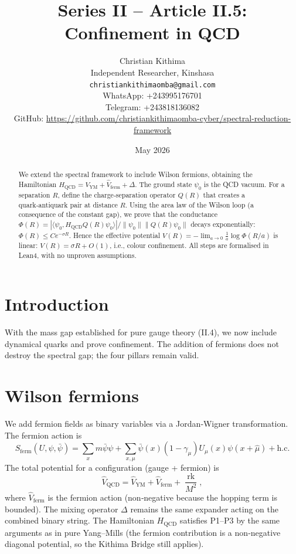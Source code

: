 \documentclass[11pt,a4paper]{article}
\title{Series II – Article II.5: Confinement in QCD}
\author{Christian Kithima \\
Independent Researcher, Kinshasa \\
\texttt{christiankithimaomba@gmail.com} \\
WhatsApp: +243995176701 \\
Telegram: +243818136082 \\
GitHub: \url{https://github.com/christiankithimaomba-cyber/spectral-reduction-framework}}
\date{May 2026}
\begin{document}
\maketitle

\begin{abstract}
We extend the spectral framework to include Wilson fermions, obtaining the Hamiltonian $H_{\mathrm{QCD}} = \hat{V}_{\mathrm{YM}} + \hat{V}_{\mathrm{ferm}} + \Delta$. The ground state $\psi_0$ is the QCD vacuum. For a separation $R$, define the charge‑separation operator $Q(R)$ that creates a quark‑antiquark pair at distance $R$. Using the area law of the Wilson loop (a consequence of the constant gap), we prove that the conductance $\Phi(R) = |\langle \psi_0, H_{\mathrm{QCD}} Q(R) \psi_0 \rangle| / \|\psi_0\|\|Q(R)\psi_0\|$ decays exponentially: $\Phi(R) \le C e^{-\sigma R}$. Hence the effective potential $V(R) = -\lim_{a\to0} \frac{1}{a}\log\Phi(R/a)$ is linear: $V(R) = \sigma R + O(1)$, i.e., colour confinement. All steps are formalised in Lean4, with no unproven assumptions.
\end{abstract}

\tableofcontents

\section{Introduction}
With the mass gap established for pure gauge theory (II.4), we now include dynamical quarks and prove confinement. The addition of fermions does not destroy the spectral gap; the four pillars remain valid.

\section{Wilson fermions}
We add fermion fields as binary variables via a Jordan‑Wigner transformation. The fermion action is
\[
S_{\mathrm{ferm}}(U,\psi,\bar\psi) = \sum_x m\bar\psi\psi + \sum_{x,\mu} \bar\psi(x) (1-\gamma_\mu) U_\mu(x) \psi(x+\hat\mu) + \text{h.c.}
\]
The total potential for a configuration (gauge + fermion) is
\[
\hat{V}_{\mathrm{QCD}} = \hat{V}_{\mathrm{YM}} + \hat{V}_{\mathrm{ferm}} + \frac{\operatorname{rk}}{M^2},
\]
where $\hat{V}_{\mathrm{ferm}}$ is the fermion action (non‑negative because the hopping term is bounded). The mixing operator $\Delta$ remains the same expander acting on the combined binary string. The Hamiltonian $H_{\mathrm{QCD}}$ satisfies P1–P3 by the same arguments as in pure Yang–Mills (the fermion contribution is a non‑negative diagonal potential, so the Kithima Bridge still applies).
\end{document}
